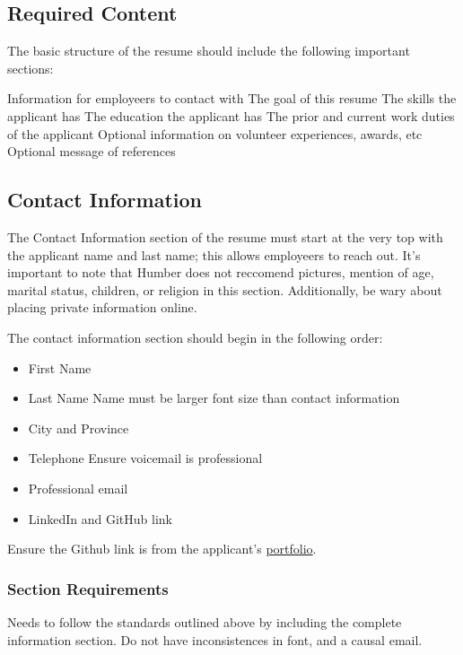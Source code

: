 \documentclass{report}
\begin{document}
	\subsection*{Required Content}
	The basic structure of the resume should include the following important sections:

	\begin{outline}
		 Information for employeers to contact with
		 The goal of this resume
		 The skills the applicant has
		 The education the applicant has
		 The prior and current work duties of the applicant
		 Optional information on volunteer experiences, awards, etc
		 Optional message of references
	\end{outline}

	\subsection{Contact Information}
    	\label{sec:contactInformation} %
	The Contact Information section of the resume must start at the very top with the applicant name and last name; this allows employeers to reach out. It's important to note that Humber does not reccomend pictures, mention of age, marital status, children, or religion in this section. Additionally, be wary about placing private information online.

	The contact information section should begin in the following order:
	\begin{itemize}
		\item First Name
		\item Last Name
			\subitem Name must be larger font size than contact information
		\item City and Province
		\item Telephone
			\subitem Ensure voicemail is professional
		\item Professional email
		\item LinkedIn and GitHub link
	\end{itemize}

	Ensure the Github link is from the applicant's \hyperref[sec:portfolio]{portfolio}.

	\subsubsection*{Section Requirements}
	Needs to follow the standards outlined above by including the complete information section. Do not have inconsistences in font, and a causal email.
\end{document}
